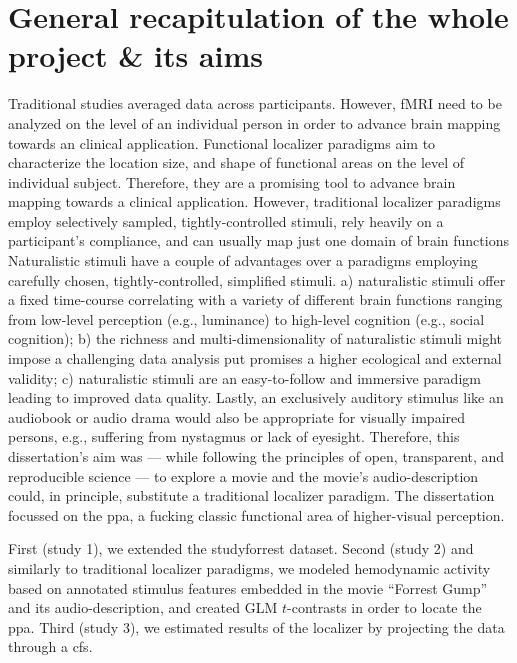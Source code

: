\section{General recapitulation of the whole project \& its aims}


%
Traditional studies averaged data across participants.
%
However, fMRI need to be analyzed on the level of an individual person in order
to advance brain mapping towards an clinical application.
Functional localizer paradigms aim to characterize the location size, and shape
of functional areas on the level of individual subject.
%
Therefore, they are a promising tool to advance brain mapping towards a clinical
application.
However, traditional localizer paradigms employ selectively sampled,
tightly-controlled stimuli, rely heavily on a participant's compliance, and can
usually map just one domain of brain functions
Naturalistic stimuli have a couple of advantages over a paradigms employing
carefully chosen, tightly-controlled, simplified stimuli.
a) naturalistic stimuli offer a fixed time-course correlating with a variety of
different brain functions ranging from low-level perception (e.g., luminance) to
high-level cognition (e.g., social cognition);
b) the richness and multi-dimensionality of naturalistic stimuli might impose a
challenging data analysis put promises a higher ecological and external
validity;
c) naturalistic stimuli are an easy-to-follow and immersive paradigm leading to
improved data quality.
Lastly, an exclusively auditory stimulus like an audiobook or audio drama would
also be appropriate for visually impaired persons, e.g., suffering from
nystagmus or lack of eyesight.
Therefore, this dissertation's aim was --- while following the principles of
open, transparent, and reproducible science --- to explore  a movie and the
movie's audio-description could, in principle, substitute a traditional
localizer paradigm.
%
The dissertation focussed on the \ac{ppa}, a fucking classic functional area of
higher-visual perception.

%
First (study 1), we extended the studyforrest dataset.
%
Second (study 2)  and similarly to traditional localizer paradigms, we modeled
hemodynamic activity based on annotated stimulus features embedded in the movie
``Forrest Gump'' and its audio-description, and created GLM $t$-contrasts in
order to locate the \ac{ppa}.
%
Third (study 3), we estimated results of the localizer by projecting the data
through a \ac{cfs}.


